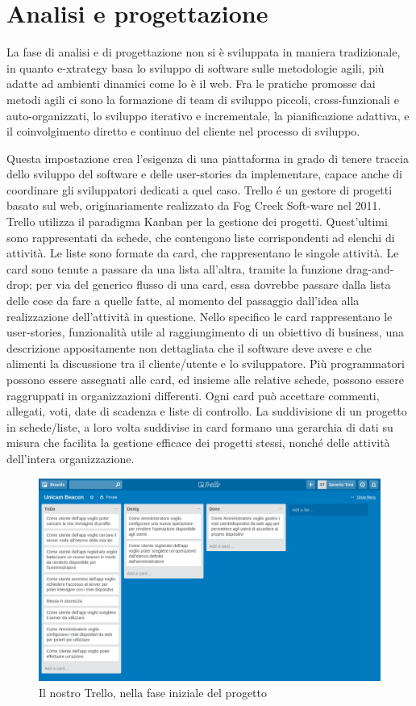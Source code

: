 \section{Analisi e progettazione}
La fase di analisi e di progettazione non si è sviluppata in maniera tradizionale, in quanto e-xtrategy basa lo sviluppo di software sulle metodologie agili, più adatte ad ambienti dinamici come lo è il web.
Fra le pratiche promosse dai metodi agili ci sono la formazione di team di sviluppo piccoli, cross-funzionali e auto-organizzati, 
lo sviluppo iterativo e incrementale, la pianificazione adattiva, e il coinvolgimento diretto e continuo del cliente nel processo di sviluppo.

Questa impostazione crea l'esigenza di una piattaforma in grado di tenere traccia dello sviluppo del software e delle user-stories da implementare, capace anche di coordinare gli sviluppatori dedicati a quel caso.
Trello\cite{trello} é un gestore di progetti basato sul web, originariamente realizzato da Fog Creek Soft-ware nel 2011.
Trello utilizza il paradigma Kanban per la gestione dei progetti. 
Quest'ultimi sono rappresentati da schede, che contengono liste corrispondenti ad elenchi di attività. 
Le liste sono formate da card, che rappresentano le singole attività. 
Le card sono tenute a passare da una lista all'altra, tramite la funzione drag-and-drop; per via del generico flusso di una card, essa dovrebbe passare dalla lista delle cose da fare a quelle fatte, al momento del passaggio dall'idea alla realizzazione dell'attività in questione.
Nello specifico le card rappresentano le user-stories, funzionalità utile al raggiungimento di un obiettivo di business, una descrizione appositamente non dettagliata che il software deve avere e che alimenti la discussione tra il cliente/utente e lo sviluppatore.
Più programmatori possono essere assegnati alle card, ed insieme alle relative schede, possono essere raggruppati in organizzazioni differenti. 
Ogni card può accettare commenti, allegati, voti, date di scadenza e liste di controllo.
La suddivisione di un progetto in schede/liste, a loro volta suddivise in card formano una gerarchia di dati su misura che facilita la gestione efficace dei progetti stessi, nonché delle attività dell'intera organizzazione.
\begin{figure}[h]
\centering
\includegraphics[scale=0.35]{Immagini/trello.png} 
\caption{Il nostro Trello, nella fase iniziale del progetto}
\end{figure}


